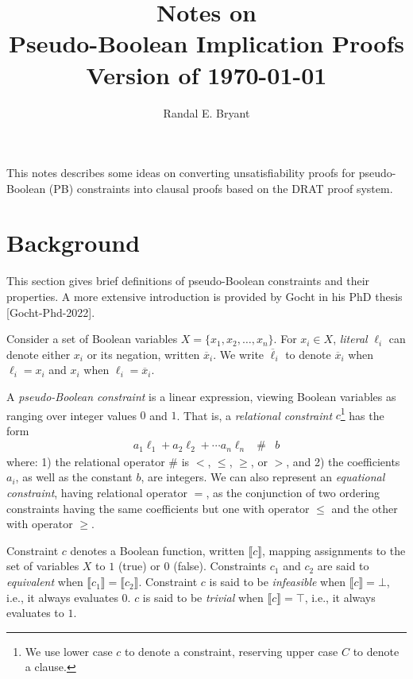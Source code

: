 \documentclass{easychair}
\title{Notes on \\ Pseudo-Boolean Implication Proofs \\ Version of \today}
\author{Randal E. Bryant}
\institute{
Computer Science Department \\
Carnegie Mellon University, Pittsburgh, PA, United States\\
\email{Randy.Bryant@cs.cmu.edu}
}
\renewcommand{\obar}[1]{\overline{#1}}
\newcommand{\lit}{\ell}
\newcommand{\func}[1]{\llbracket#1\rrbracket}
\begin{document}
\maketitle

This notes describes some ideas on converting unsatisfiability proofs
for pseudo-Boolean (PB) constraints into clausal proofs based on the
DRAT proof system.

\section{Background}

This section gives brief definitions of pseudo-Boolean constraints and their properties.
A more extensive introduction is provided by Gocht in his PhD thesis [Gocht-Phd-2022].

Consider a set of Boolean variables $X = \{x_1, x_2, \ldots, x_n \}$.  For $x_i \in X$, {\em literal}
$\lit_i$ can denote either $x_i$ or its negation, written $\obar{x}_i$.  We
write $\obar{\lit}_i$ to denote $\obar{x}_i$ when $\lit_i = x_i$ and $x_i$ when
$\lit_i = \obar{x}_i$.

A {\em pseudo-Boolean constraint} is a linear expression, viewing
Boolean variables as ranging over integer values $0$ and $1$.  That
is, 
a \emph{relational constraint} $c$\footnote{We use lower case $c$ to denote a constraint, reserving upper case $C$ to denote a clause.}  has the form
\begin{eqnarray}
a_1 \lit_1 + a_2 \lit_2 + \cdots a_n \lit_n & \#  & b \label{eqn:pbconstraint}
\end{eqnarray}
where:
1) the relational operator $\#$ is $<$, $\leq$, $\geq$, or $>$,
and 2) the coefficients $a_i$, as well as the constant $b$, are
integers.  We can also represent an \emph{equational constraint}, having
relational operator $=$, as the conjunction of two ordering constraints having the same coefficients but one with
operator $\leq$ and the other with operator $\geq$.


Constraint $c$ denotes a Boolean function, written
$\func{c}$, mapping assignments to the set of variables $X$ to $1$
(true) or $0$ (false).  Constraints $c_1$ and $c_2$ are said to {\em
  equivalent} when $\func{c_1} = \func{c_2}$.
Constraint $c$ is said to be {\em infeasible} when $\func{c} = \bot$, i.e., it always evaluates $0$.
$c$ is said to be {\em trivial} when $\func{c} = \top$, i.e., it always evaluates to $1$.
\end{document}
